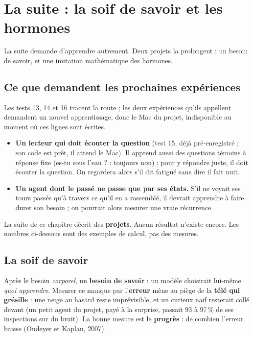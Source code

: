 \documentclass[fontsize=10pt,paper=a4,parskip=half-]{scrartcl}
\newcommand{\lead}[1]{{\fontsize{12}{16.5}\selectfont\color{ink!85!black}#1\par}\vspace{0.3em}}
\newcommand{\q}[1]{\og #1\fg{}}
\newcommand{\pc}{\,\%}
\begin{document}
\section{La suite : la soif de savoir et les hormones}
\label{sec:suite}

\lead{La suite demande d'apprendre autrement. Deux projets la prolongent : un besoin de
savoir, et une imitation mathématique des hormones.}

\subsection{Ce que demandent les prochaines expériences}
Les tests 13, 14 et 16 tracent la route ; les deux expériences qu'ils appellent demandent un
nouvel apprentissage, donc le Mac du projet, indisponible au moment où ces lignes sont
écrites.
\begin{itemize}
  \item \textbf{Un lecteur qui doit écouter la question} (test 15, déjà pré-enregistré ;
  son code est prêt, il attend le Mac). Il apprend aussi des questions témoins à réponse fixe (\q{es-tu sous l'eau ?} : toujours
  non) ; pour y répondre juste, il doit écouter la question. On regardera alors s'il dit
  \q{fatigué} sans dire \q{il fait nuit}.
  \item \textbf{Un agent dont le passé ne passe que par ses états.} S'il ne voyait ses
  tours passés qu'à travers ce qu'il en a rassemblé, il devrait apprendre à faire durer
  son besoin ; on pourrait alors mesurer une vraie récurrence.
\end{itemize}

\begin{limite}
La suite de ce chapitre décrit des \textbf{projets}. Aucun résultat n'existe encore. Les
nombres ci-dessous sont des exemples de calcul, pas des mesures.
\end{limite}

\subsection{La soif de savoir}
Après le besoin \emph{corporel}, un \textbf{besoin de savoir} : un modèle choisirait
lui-même \emph{quoi apprendre}. Mesurer ce manque par l'\textbf{erreur} mène au piège de la
\textbf{télé qui grésille} : une neige au hasard reste imprévisible, et un curieux naïf
resterait collé devant (un petit agent du projet, payé à la surprise, passait 93 à 97\pc{}
de ses inspections sur du bruit). La bonne mesure est le \textbf{progrès} : de combien
l'erreur baisse (Oudeyer et Kaplan, 2007).
\end{document}
